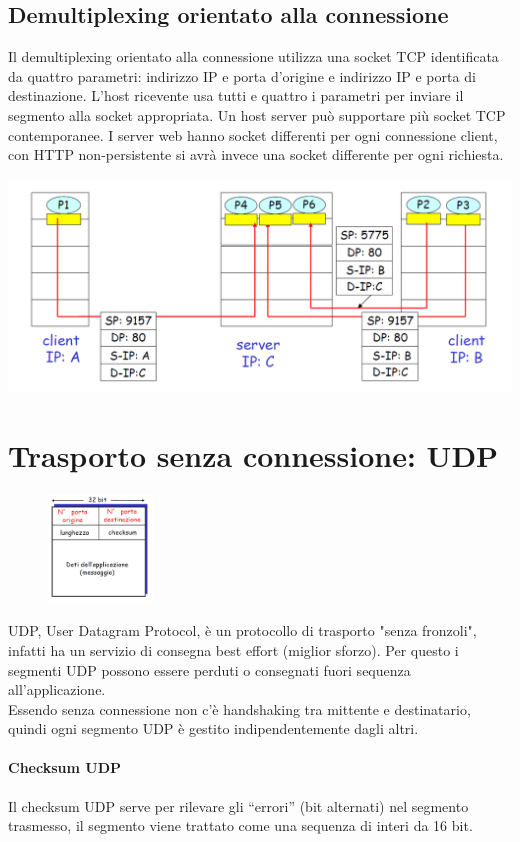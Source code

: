 \documentclass{report}
\begin{document}
	\subsection{Demultiplexing orientato alla connessione}
	Il demultiplexing orientato alla connessione utilizza una socket TCP identificata da quattro parametri: indirizzo IP e porta d'origine e indirizzo IP e porta di destinazione. L'host ricevente usa tutti e quattro i parametri per inviare il segmento alla socket appropriata. Un host server può supportare più socket TCP contemporanee. I server web hanno socket differenti per ogni connessione client, con HTTP non-persistente si avrà invece una socket differente per ogni richiesta.
	\begin{center}
		\includegraphics[width=0.7\linewidth]{socket-tcp}
	\end{center}
	\section{Trasporto senza connessione: UDP}
	\begin{figure}
		\centering
		\vspace{-30pt}
		\includegraphics[width=0.25\textwidth]{segmento-udp}
		\vspace{-20pt}
	\end{figure}

	UDP, User Datagram Protocol, è un protocollo di trasporto "senza fronzoli", infatti ha un servizio di consegna best effort (miglior sforzo). Per questo i segmenti UDP possono essere perduti o consegnati fuori sequenza all'applicazione.\medskip\\ Essendo senza connessione non c'è handshaking tra mittente e destinatario, quindi ogni segmento UDP è gestito indipendentemente dagli altri.
	\paragraph{Checksum UDP} Il checksum UDP serve per rilevare gli “errori” (bit alternati) nel segmento trasmesso, il segmento viene trattato come una sequenza di interi da 16 bit.
	
	
	
	
	
	
	
	
	
	
	
	
	
	
	
	
	
	
	
\end{document}
